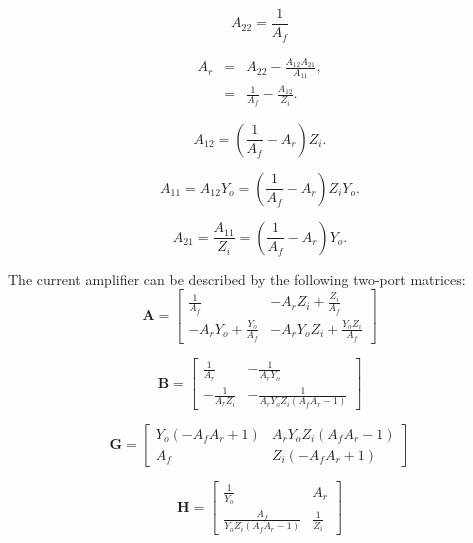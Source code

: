 \documentclass[a4paper, 12pt]{article}
\newcommand{\mat}[1]{\mathbf{#1}}
\newcommand{\encp}[1]{\left(#1\right)}
\begin{document}
\begin{equation}
  A_{22} = \frac{1}{A_f}
\end{equation}

\begin{eqnarray}
  A_r & = & A_{22} - \frac{A_{12} A_{21}}{A_{11}}, \\
      & = & \frac{1}{A_f} - \frac{A_{12}}{Z_i}.
\end{eqnarray}

\begin{equation}
  A_{12} = \encp{\frac{1}{A_f} - A_r} Z_i.
\end{equation}

\begin{equation}
  A_{11} = A_{12} Y_o = \encp{\frac{1}{A_f} - A_r} Z_i Y_o.
\end{equation}

\begin{equation}
  A_{21} = \frac{A_{11}}{Z_i} = \encp{\frac{1}{A_f} - A_r} Y_o.
\end{equation}


The current amplifier can be described by the following two-port
matrices:
\begin{equation}
\mat{A} = \left[\begin{matrix}\frac{1}{A_{f}} & - A_{r} Z_{i} + \frac{Z_{i}}{A_{f}}\\- A_{r} Y_{o} + \frac{Y_{o}}{A_{f}} & - A_{r} Y_{o} Z_{i} + \frac{Y_{o} Z_{i}}{A_{f}}\end{matrix}\right]
\end{equation}

\begin{equation}
\mat{B} = \left[\begin{matrix}\frac{1}{A_{r}} & - \frac{1}{A_{r} Y_{o}}\\- \frac{1}{A_{r} Z_{i}} & - \frac{1}{A_{r} Y_{o} Z_{i} \left(A_{f} A_{r} - 1\right)}\end{matrix}\right]
\end{equation}

\begin{equation}
\mat{G} = \left[\begin{matrix}Y_{o} \left(- A_{f} A_{r} + 1\right) & A_{r} Y_{o} Z_{i} \left(A_{f} A_{r} - 1\right)\\A_{f} & Z_{i} \left(- A_{f} A_{r} + 1\right)\end{matrix}\right]
\end{equation}

\begin{equation}
\mat{H} = \left[\begin{matrix}\frac{1}{Y_{o}} & A_{r}\\\frac{A_{f}}{Y_{o} Z_{i} \left(A_{f} A_{r} - 1\right)} & \frac{1}{Z_{i}}\end{matrix}\right]
\end{equation}
\end{document}
